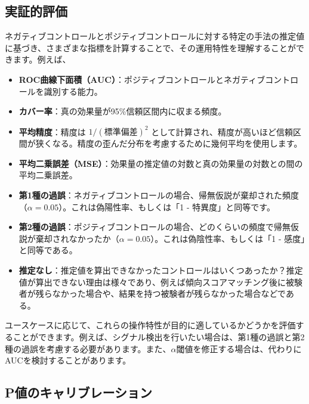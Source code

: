 \documentclass[
  11pt]{book}
\theoremstyle{definition}
\theoremstyle{definition}
\theoremstyle{definition}
\theoremstyle{definition}
\theoremstyle{remark}
\begin{document}
\subsection{実証的評価}\label{metrics}


ネガティブコントロールとポジティブコントロールに対する特定の手法の推定値に基づき、さまざまな指標を計算することで、その運用特性を理解することができます。例えば、

\begin{itemize}
\item
  \textbf{ROC曲線下面積（AUC）}：ポジティブコントロールとネガティブコントロールを識別する能力。
\item
  \textbf{カバー率}：真の効果量が95\%信頼区間内に収まる頻度。
\item
  \textbf{平均精度}：精度は \(1/(標準偏差)^2\) として計算され、精度が高いほど信頼区間が狭くなる。精度の歪んだ分布を考慮するために幾何平均を使用します。
\item
  \textbf{平均二乗誤差（MSE）}：効果量の推定値の対数と真の効果量の対数との間の平均二乗誤差。
\item
  \textbf{第1種の過誤}：ネガティブコントロールの場合、帰無仮説が棄却された頻度（\(\alpha = 0.05\)）。これは偽陽性率、もしくは「1 - 特異度」と同等です。
\item
  \textbf{第2種の過誤}：ポジティブコントロールの場合、どのくらいの頻度で帰無仮説が棄却されなかったか（\(\alpha = 0.05\)）。これは偽陰性率、もしくは「1 - 感度」と同等である。
\item
  \textbf{推定なし}：推定値を算出できなかったコントロールはいくつあったか？推定値が算出できない理由は様々であり、例えば傾向スコアマッチング後に被験者が残らなかった場合や、結果を持つ被験者が残らなかった場合などである。
\end{itemize}

ユースケースに応じて、これらの操作特性が目的に適しているかどうかを評価することができます。例えば、シグナル検出を行いたい場合は、第1種の過誤と第2種の過誤を考慮する必要があります。また、\(\alpha\)閾値を修正する場合は、代わりにAUCを検討することがあります。

\subsection{P値のキャリブレーション}\label{pux5024ux306eux30adux30e3ux30eaux30d6ux30ecux30fcux30b7ux30e7ux30f3}

 
\end{document}
